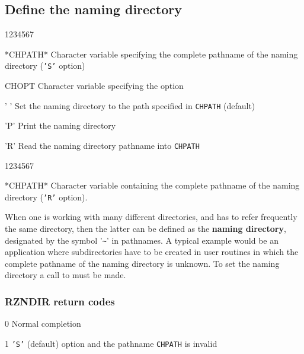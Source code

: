 \subsection{Define the naming directory}
\Idesc
\begin{DLtt}{1234567}
\item[*CHPATH*]Character variable specifying the complete pathname of the
naming directory ({\tt'S'} option)
\item[CHOPT]Character variable specifying the option
\begin{DLtt}{12}
\item[' ']Set the naming directory to the path specified in
{\tt CHPATH} (default)
\item['P']Print the naming directory
\item['R']Read the naming directory pathname into {\tt CHPATH}
\end{DLtt}
\end{DLtt}
\Odesc
\begin{DLtt}{1234567}
\item[*CHPATH*]Character variable containing the complete pathname of the
naming directory ({\tt'R'} option).
\end{DLtt}
\par 
When one is working with many different directories, and has to
refer frequently the same directory, then the latter can be defined
as the {\bf naming directory}, designated by the symbol
'\verb!~!'
in pathnames.
A typical example would be an application where subdirectories have
to be created in user routines in which the complete pathname of the
naming directory is unknown.
To set the naming directory a call to  must be made.
\subsubsection*{RZNDIR return codes}
\begin{DLtt}{12}
\item[0]Normal completion
\item[1]{\tt'S'} (default) option and the pathname {\tt CHPATH} is invalid
\end{DLtt}
